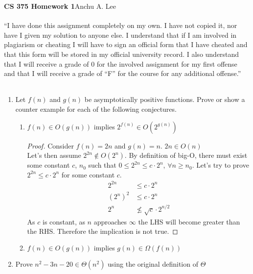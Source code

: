 \documentclass{article}
\begin{document}
        \noindent\textbf{CS 375 Homework 1}\hfill Anchu A. Lee
        \\\\“I have done this assignment completely on my own. I have not copied it, nor have I given my solution to anyone else. I understand that if I am involved in plagiarism or cheating I will have to sign an official form that I have cheated and that this form will be stored in my official university record. I also understand that I will receive a grade of 0 for the involved assignment for my first offense and that I will receive a grade of “F” for the course for any additional offense.” 
        \\\\
        \begin{enumerate}
            \item Let $f(n)$ and $g(n)$ be asymptotically positive functions. Prove or show a counter example for each of the following conjectures.
                \begin{enumerate}
                    \item $f(n)\in O(g(n))$ implies $2^{f(n)}\in O(2^{g(n)})$
                        \begin{proof}
                            Consider $f(n) = 2n$ and $g(n) = n$.
                            $2n \in O(n)$\\
                            Let's then assume $2^{2n}\not\in O(2^{n})$. By definition of big-O, there must exist some constant $c$, $n_0$
                             such that $0\leq 2^{2n}\leq c\cdot 2^n$, $\forall n\geq n_0$. Let's try to prove $2^{2n}\leq c\cdot 2^n$ for some constant $c$.
                            \begin{align*}
                                2^{2n}&\leq c\cdot 2^n\\
                                (2^n)^2&\leq c\cdot 2^n\\
                                2^n&\not\leq \sqrt{c}\cdot 2^{n/2}
                            \end{align*}                      
                            As $c$ is constant, as $n$ approaches $\infty$ the LHS will become greater than the RHS. Therefore the implication is not true.
                        \end{proof}
                    \item $f(n)\in O(g(n))$ implies $g(n)\in\Omega(f(n))$
                \end{enumerate}
            \item Prove $n^2-3n-20\in\Theta(n^2)$ using the original definition of $\Theta$

\end{enumerate}
\end{document}
